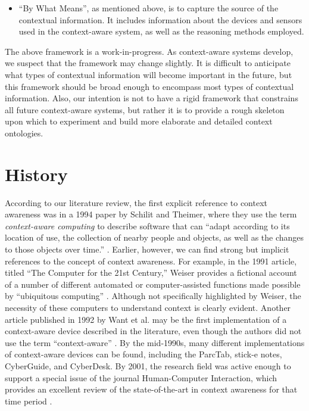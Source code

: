 \begin{itemize}
%
\item ``By What Means'', as mentioned above, is to capture the source of the contextual information. It includes information about the devices and sensors used in the context-aware system, as well as the reasoning methods employed.
\end{itemize}

The above framework is a work-in-progress. As context-aware systems develop, we suspect that the framework may change slightly. It is difficult to anticipate what types of contextual information will become important in the future, but this framework should be broad enough to encompass most types of contextual information. Also, our intention is not to have a rigid framework that constrains all future context-aware systems, but rather it is to provide a rough skeleton upon which to experiment and build more elaborate and detailed context ontologies.

\section{History}
\label{sec:history}

According to our literature review, the first explicit reference to context awareness was in a 1994 paper by Schilit and Theimer, where they use the term \emph{context-aware computing} to describe software that can ``adapt according to its location of use, the collection of nearby people and objects, as well as the changes to those objects over time.'' \cite{schilit1994disseminating}. Earlier, however, we can find strong but implicit references to the concept of context awareness. For example, in the 1991 article, titled ``The Computer for the 21st Century,'' Weiser provides a fictional account of a number of different automated or computer-assisted functions made possible by ``ubiquitous computing'' \cite{weiser1991computer}. Although not specifically highlighted by Weiser, the necessity of these computers to understand context is clearly evident. Another article published in 1992 by Want et al. may be the first implementation of a context-aware device described in the literature, even though the authors did not use the term ``context-aware'' \cite{want1992active}. By the mid-1990s, many different implementations of context-aware devices can be found, including the ParcTab, stick-e notes, CyberGuide, and CyberDesk. By 2001, the research field was active enough to support a special issue of the journal Human-Computer Interaction, which provides an excellent review of the state-of-the-art in context awareness for that time period \cite{moran2001introduction}.

